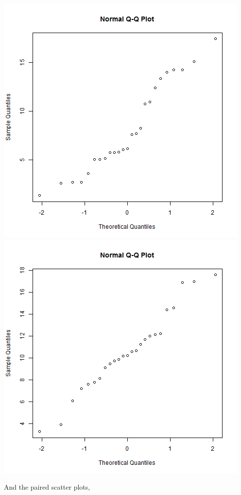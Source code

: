 \documentclass[letterpaper,10pt]{article}
\begin{document}
\begin{description}
\begin{enumerate}
\begin{center}
\includegraphics[scale=.33]{QQRepair.png}
\includegraphics[scale=.33]{QQCapital.png}
\end{center}
And the paired scatter plots,
\begin{center}

\end{center}
\end{enumerate}
\end{description}
\end{document}
